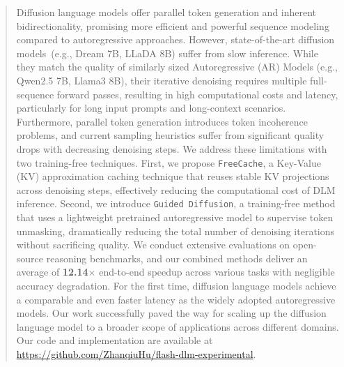 \begin{abstract}
Diffusion language models offer parallel token generation and inherent bidirectionality, promising more efficient and powerful sequence modeling compared to autoregressive approaches. However, state-of-the-art diffusion models~(e.g., Dream 7B, LLaDA 8B) suffer from slow inference. While they match the quality of similarly sized Autoregressive (AR) Models (e.g., Qwen2.5 7B, Llama3 8B), their iterative denoising requires multiple full-sequence forward passes, resulting in high computational costs and latency, particularly for long input prompts and long-context scenarios. Furthermore, parallel token generation introduces token incoherence problems, and current sampling heuristics suffer from significant quality drops with decreasing denoising steps. We address these limitations with two training-free techniques. First, we propose \texttt{FreeCache}, a Key-Value (KV) approximation caching technique that reuses stable KV projections across denoising steps, effectively reducing the computational cost of DLM inference. 
Second, we introduce \texttt{Guided Diffusion}, a training-free method that uses a lightweight pretrained autoregressive model to supervise token unmasking, dramatically reducing the total number of denoising iterations without sacrificing quality.
We conduct extensive evaluations on open-source reasoning benchmarks, and our combined methods deliver an average of \textbf{12.14}$\times$ end-to-end speedup across various tasks with negligible accuracy degradation. For the first time, diffusion language models achieve a comparable and even faster latency as the widely adopted autoregressive models. Our work successfully paved the way for scaling up the diffusion language model to a broader scope of applications across different domains. Our code and implementation are available at 
\url{https://github.com/ZhanqiuHu/flash-dlm-experimental}.

\end{abstract}
